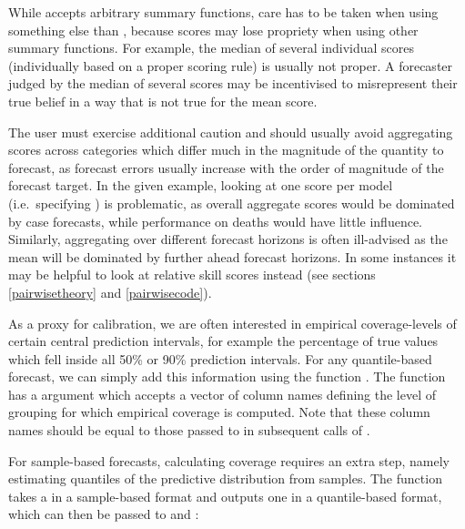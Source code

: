 \documentclass[
]{jss}
\begin{document}
While  accepts arbitrary summary functions,
care has to be taken when using something else than ,
because scores may lose propriety when using other summary functions.
For example, the median of several individual scores (individually based
on a proper scoring rule) is usually not proper. A forecaster judged by
the median of several scores may be incentivised to misrepresent their
true belief in a way that is not true for the mean score.

The user must exercise additional caution and should usually avoid
aggregating scores across categories which differ much in the magnitude
of the quantity to forecast, as forecast errors usually increase with
the order of magnitude of the forecast target. In the given example,
looking at one score per model (i.e.~specifying
) is problematic, as overall aggregate
scores would be dominated by case forecasts, while performance on deaths
would have little influence. Similarly, aggregating over different
forecast horizons is often ill-advised as the mean will be dominated by
further ahead forecast horizons. In some instances it may be helpful to
look at relative skill scores instead (see sections \ref{pairwisetheory}
and \ref{pairwisecode}).

As a proxy for calibration, we are often interested in empirical
coverage-levels of certain central prediction intervals, for example the
percentage of true values which fell inside all 50\% or 90\% prediction
intervals. For any quantile-based forecast, we can simply add this
information using the function . The function has
a  argument which accepts a vector of column names defining the
level of grouping for which empirical coverage is computed. Note that
these column names should be equal to those passed to  in
subsequent calls of .

For sample-based forecasts, calculating coverage requires an extra step,
namely estimating quantiles of the predictive distribution from samples.
The function  takes a  in
a sample-based format and outputs one in a quantile-based format, which
can then be passed to  and :
\end{document}
